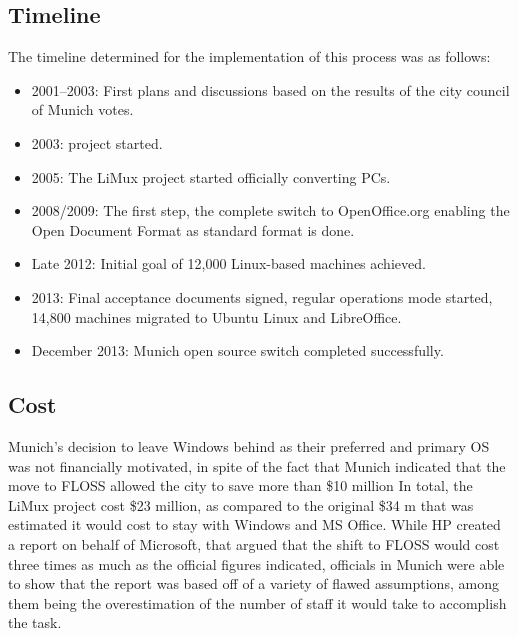 \subsection{Timeline}
The timeline determined for the implementation of this process was as follows:
\begin{itemize}
\item 2001–2003: First plans and discussions based on the results of the city council of Munich votes.
\item 2003: project started.
\item 2005: The LiMux project started officially converting PCs.
\item 2008/2009: The first step, the complete switch to OpenOffice.org enabling the Open Document Format as standard format is done.
\item Late 2012: Initial goal of 12,000 Linux-based machines achieved.
\item  2013: Final acceptance documents signed, regular operations mode started, 14,800 machines migrated to Ubuntu Linux and LibreOffice.
\item December 2013: Munich open source switch completed successfully.

\end{itemize}
\subsection{Cost}

Munich’s decision to leave Windows behind as their preferred and primary OS was not financially motivated, in spite of the fact that Munich indicated that the move to FLOSS allowed the city to save more than \$10 million In total, the LiMux project cost  \$23 million, as compared to the original  \$34 m  that was estimated it would cost to stay with Windows and MS Office. While HP created a report on behalf of Microsoft, that argued that the shift to FLOSS would cost three times as much as the official figures indicated, officials in Munich were able to show that the report was based off of a variety of flawed assumptions, among them being the overestimation of the number of staff it would take to accomplish the task.

